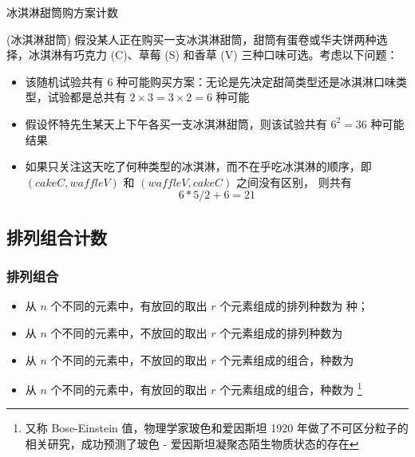 \documentclass[Prob-All.tex]{subfiles}
\begin{document}
\begin{frame}{冰淇淋甜筒购方案计数}
	\begin{exam}
		(冰淇淋甜筒) 假没某人正在购买一支冰淇淋甜筒，甜筒有蛋卷或华夫饼两种选择，冰淇淋有巧克力 (C)、草莓 (S) 和香草 (V) 三种口味可选。考虑以下问题：
		\begin{itemize}[<+-|alert@+>]
			\item  该随机试验共有 6 种可能购买方案：无论是先决定甜简类型还是冰淇淋口味类型，试验都是总共有 $2\times 3=3\times 2=6$ 种可能
			\item  假设怀特先生某天上下午各买一支冰淇淋甜筒，则该试验共有 $6^2=36$ 种可能结果
			\item  如果只关注这天吃了何种类型的冰淇淋，而不在乎吃冰淇淋的顺序，即 $(cakeC, waffleV)$ 和 $(waffleV, cakeC)$ 之间没有区别， 则共有 \pause
			\[6*5/2+6=21\]
		 \end{itemize}
	\end{exam}


\end{frame}

\subsection{排列组合计数}


\begin{frame}
	\frametitle{排列组合}
	\begin{itemize}[<+-|alert@+>]
		\item 从 $n$ 个不同的元素中，有放回的取出 $r$ 个元素组成的排列种数为  种；
		\item 从 $n$ 个不同的元素中，不放回的取出 $r$ 个元素组成的排列种数为 
		\item 从 $n$ 个不同的元素中，不放回的取出 $r$ 个元素组成的组合，种数为 
		\item 从 $n$ 个不同的元素中，有放回的取出 $r$ 个元素组成的组合，种数为 \footnote{又称 Bose-Einstein 值，物理学家玻色和爱因斯坦 1920 年做了不可区分粒子的相关研究，成功预测了玻色 - 爱因斯坦凝聚态陌生物质状态的存在}
	\end{itemize}

\end{frame}
\end{document}
